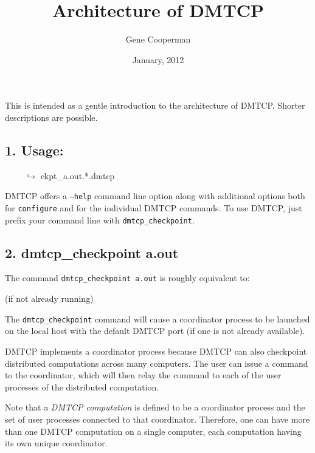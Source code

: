 \documentclass{article}
\title{Architecture of DMTCP}
\author{Gene Cooperman}
\date{January, 2012}
\begin{document}
\maketitle

This is intended as a gentle introduction to the architecture of DMTCP.
Shorter descriptions are possible.

\subsection*{1. Usage:}
\begin{algorithmic}[1]
 \newline
\hbox{\ \ \ \ } $\hookrightarrow$ ckpt\_a.out.*.dmtcp
\end{algorithmic}

\bigskip
\noindent
DMTCP offers a {\tt --help} command line option along with additional options
both for {\tt configure} and for the individual DMTCP commands.
To use DMTCP, just prefix your command line with {\tt dmtcp\_checkpoint}.

\subsection*{2. dmtcp\_checkpoint a.out}

The command {\tt dmtcp\_checkpoint a.out} is roughly equivalent to:

\begin{algorithmic}[1]
  (if not already running)
\end{algorithmic}

The {\tt dmtcp\_checkpoint} command will cause a coordinator process
to be launched on the local host with the default DMTCP port (if one is
not already available).

DMTCP implements a coordinator process because DMTCP can also checkpoint
distributed computations across many computers.  The user can issue a command
to the coordinator, which will then relay the command to each of
the user processes of the distributed computation.

Note that a {\em DMTCP computation} is defined to be a coordinator process
and the set of user processes connected to that coordinator.  Therefore,
one can have more than one DMTCP computation on a single computer,
each computation having its own unique coordinator.
\end{document}
